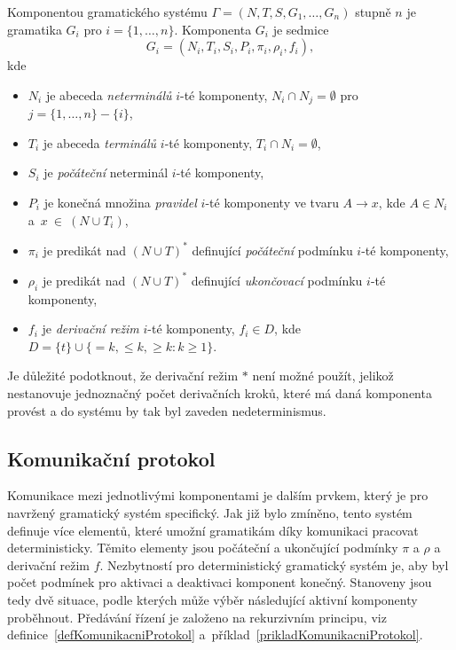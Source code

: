\begin{definice}
  Komponentou gramatického systému $\Gamma = (N, T, S, G_1, \dots, G_n)$ stupně $n$ je gramatika $G_i$ pro $i=\{1, \dots, n\}$. Komponenta $G_i$ je sedmice
  $$G_i = (N_i, T_i, S_i, P_i, \pi_i, \rho_i, f_i),$$
  kde
  \begin{itemize}
    \item $N_i$ je abeceda \emph{neterminálů} $i$-té komponenty, $N_i \cap N_j = \emptyset$ pro $j = \{1, \dots, n\} - \{i\}$,
    \item $T_i$ je abeceda \emph{terminálů} $i$-té komponenty, $T_i \cap N_i = \emptyset$,
    \item $S_i$ je \emph{počáteční} neterminál $i$-té komponenty,
    \item $P_i$ je konečná množina \emph{pravidel} $i$-té komponenty ve tvaru $A \rightarrow x$, kde $A \in N_i$ a~$x~\in~(N \cup T_i)$,
    \item $\pi_i$ je predikát nad $(N \cup T)^*$ definující \emph{počáteční} podmínku $i$-té komponenty,
    \item $\rho_i$ je predikát nad $(N \cup T)^*$ definující \emph{ukončovací} podmínku $i$-té komponenty,
    \item $f_i$ je \emph{derivační režim} $i$-té komponenty, $f_i \in D$, kde $D = \{t\} \cup \{=k, \leq k, \geq k\!: k \geq 1\}$.
  \end{itemize}
\end{definice}
Je důležité podotknout, že derivační režim $*$ není možné použít, jelikož nestanovuje jednoznačný počet derivačních kroků, které má daná komponenta
provést a do systému by tak byl zaveden nedeterminismus.

\subsection*{Komunikační protokol}
Komunikace mezi jednotlivými komponentami je dalším prvkem, který je pro navržený gramatický systém specifický. Jak již bylo zmíněno, tento systém
definuje více elementů, které umožní gramatikám díky komunikaci pracovat deterministicky. Těmito elementy jsou počáteční a ukončující podmínky $\pi$ a $\rho$ a
derivační režim $f$. Nezbytností pro deterministický gramatický systém je, aby byl počet podmínek pro aktivaci a deaktivaci komponent konečný.
Stanoveny jsou tedy dvě situace, podle kterých může výběr následující aktivní komponenty proběhnout.
Předávání řízení je založeno na rekurzivním principu, viz definice~\ref{defKomunikacniProtokol} a~příklad~\ref{prikladKomunikacniProtokol}.

